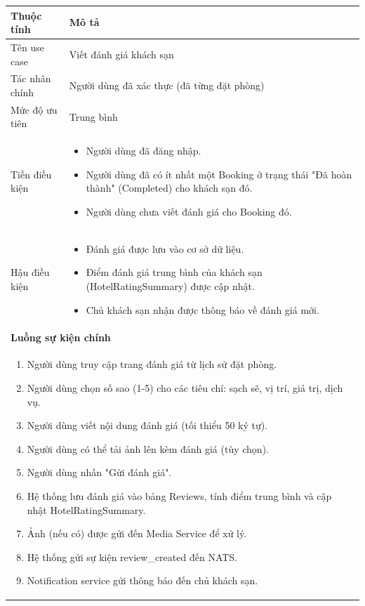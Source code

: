 \documentclass[13pt,a4paper,twoside]{report}
\begin{document}
\begin{longtable}{p{3.5cm} p{11.5cm}}
  \toprule
  \textbf{Thuộc tính} & \textbf{Mô tả} \\
  \midrule
  Tên use case & Viết đánh giá khách sạn \\
  Tác nhân chính & Người dùng đã xác thực (đã từng đặt phòng) \\
  Mức độ ưu tiên & Trung bình \\
  \midrule
  Tiền điều kiện &
  \begin{itemize}[nosep]
    \item Người dùng đã đăng nhập.
    \item Người dùng đã có ít nhất một Booking ở trạng thái "Đã hoàn thành" (Completed) cho khách sạn đó.
    \item Người dùng chưa viết đánh giá cho Booking đó.
  \end{itemize} \\
  \midrule
  Hậu điều kiện &
  \begin{itemize}[nosep]
    \item Đánh giá được lưu vào cơ sở dữ liệu.
    \item Điểm đánh giá trung bình của khách sạn (HotelRatingSummary) được cập nhật.
    \item Chủ khách sạn nhận được thông báo về đánh giá mới.
  \end{itemize} \\
  \midrule
  \multicolumn{2}{p{15cm}}{\textbf{Luồng sự kiện chính}} \\
  \midrule
  \multicolumn{2}{p{15cm}}{%
    \begin{enumerate}[nosep]
      \item Người dùng truy cập trang đánh giá từ lịch sử đặt phòng.
      \item Người dùng chọn số sao (1-5) cho các tiêu chí: sạch sẽ, vị trí, giá trị, dịch vụ.
      \item Người dùng viết nội dung đánh giá (tối thiểu 50 ký tự).
      \item Người dùng có thể tải ảnh lên kèm đánh giá (tùy chọn).
      \item Người dùng nhấn "Gửi đánh giá".
      \item Hệ thống lưu đánh giá vào bảng Reviews, tính điểm trung bình và cập nhật HotelRatingSummary.
      \item Ảnh (nếu có) được gửi đến Media Service để xử lý.
      \item Hệ thống gửi sự kiện review\_created đến NATS.
      \item Notification service gửi thông báo đến chủ khách sạn.
    \end{enumerate}
  } \\
  \bottomrule
\end{longtable}
\end{document}
